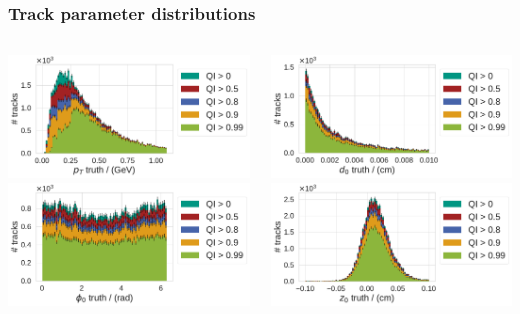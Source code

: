 \documentclass[18pt, aspectratio=169]{beamer}
\begin{document}
\begin{frame}
  \frametitle{Track parameter distributions}
  \begin{columns}
    \begin{column}{.5\textwidth}
      \centering
      \includegraphics[width=.9\textwidth]{figures/combined-qi/pt_distributions_by_qi.pdf}
      \includegraphics[width=.9\textwidth]{figures/combined-qi/phi0_distributions_by_qi.pdf}
    \end{column}
    \begin{column}{.5\textwidth}
      \centering
      \includegraphics[width=.9\textwidth]{figures/combined-qi/d0_distributions_by_qi.pdf}
      \includegraphics[width=.9\textwidth]{figures/combined-qi/z0_distributions_by_qi.pdf}

\end{column}
\end{columns}
\end{frame}
\end{document}

